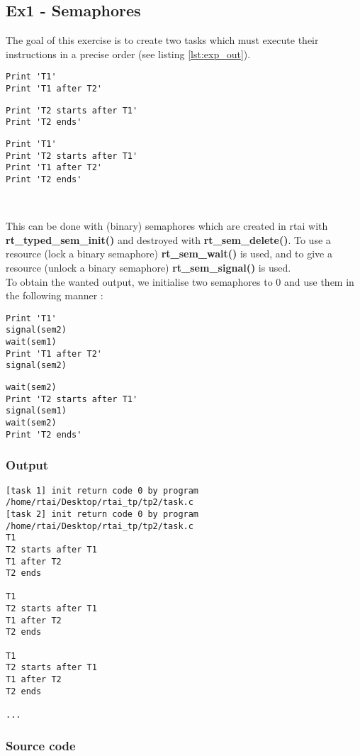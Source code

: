 \subsection{Ex1 - Semaphores}
The goal of this exercise is to create two tasks which must execute their instructions in a precise order (see listing \ref{lst:exp_out}).

\begin{multicols}{2}
\begin{lstlisting}[numbers=none,caption = {Task 1}]
Print 'T1'
Print 'T1 after T2'
\end{lstlisting}

\begin{lstlisting}[numbers=none, caption={Task 2}]
Print 'T2 starts after T1'
Print 'T2 ends'
\end{lstlisting}
\end{multicols}

\begin{lstlisting}[numbers=none, caption={Expected output}, label={lst:exp_out}]
Print 'T1'
Print 'T2 starts after T1'
Print 'T1 after T2'
Print 'T2 ends'
\end{lstlisting}
\

This can be done with (binary) semaphores which are created in rtai with \textbf{rt\_typed\_sem\_init()} and destroyed with \textbf{rt\_sem\_delete()}. To use a resource (lock a binary semaphore) \textbf{rt\_sem\_wait()} is used, and to give a resource (unlock a binary semaphore) \textbf{rt\_sem\_signal()} is used.\\

To obtain the wanted output, we initialise two semaphores to 0 and use them in the following manner :
\begin{multicols}{2}
\begin{lstlisting}[numbers=none,caption = {Task 1}]
Print 'T1'
signal(sem2)
wait(sem1)
Print 'T1 after T2'
signal(sem2)
\end{lstlisting}

\begin{lstlisting}[numbers=none, caption={Task 2}]
wait(sem2)
Print 'T2 starts after T1'
signal(sem1)
wait(sem2)
Print 'T2 ends'
\end{lstlisting}
\end{multicols}

\subsubsection{Output}
\begin{lstlisting}[keywordstyle=\color{black}]
[task 1] init return code 0 by program /home/rtai/Desktop/rtai_tp/tp2/task.c
[task 2] init return code 0 by program /home/rtai/Desktop/rtai_tp/tp2/task.c
T1
T2 starts after T1
T1 after T2
T2 ends

T1
T2 starts after T1
T1 after T2
T2 ends

T1
T2 starts after T1
T1 after T2
T2 ends

...
\end{lstlisting}

\subsubsection{Source code}

